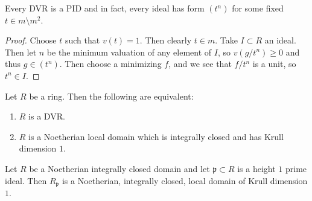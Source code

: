 \documentclass[twoside, 10pt]{article}
\begin{document}
        \begin{lem}
            Every DVR is a PID and in fact, every ideal has form $(t^n)$ for some fixed $t \in m \setminus m^2$.
            \begin{proof}
                Choose $t$ such that $v(t) = 1$. Then clearly $t \in m$. Take $I \subset R$ an ideal. Then let $n$ be the minimum valuation of any element of $I$, so $v(g/t^n) \geq 0$ and thus $g \in (t^n)$. Then choose a minimizing $f$, and we see that $f/t^n$ is a unit, so $t^n \in I$.
            \end{proof}
        \end{lem}

        \begin{thm}
            Let $R$ be a ring. Then the following are equivalent:
            \begin{enumerate}
                \item $R$ is a DVR.
                \item $R$ is a Noetherian local domain which is integrally closed and has Krull dimension $1$.
            \end{enumerate}
        \end{thm}

        \begin{cor}
            Let $R$ be a Noetherian integrally closed domain and let $\mathfrak{p} \subset R$ is a height $1$ prime ideal. Then $R_{\mathfrak{p}}$ is a Noetherian, integrally closed, local domain of Krull dimension $1$.
        \end{cor}
\end{document}
